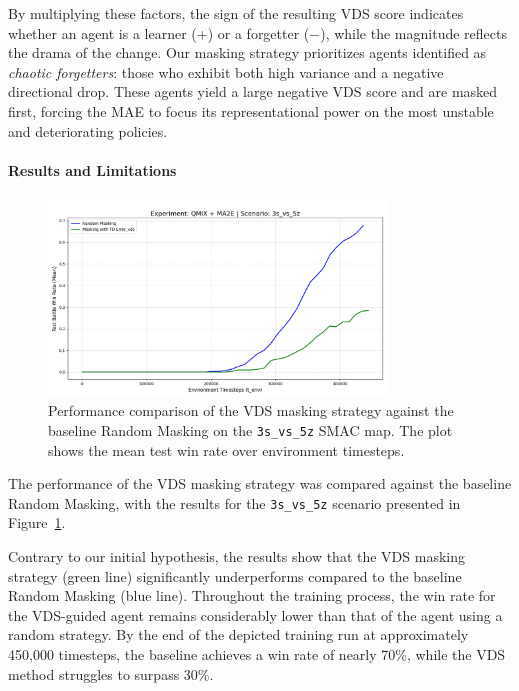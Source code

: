 By multiplying these factors, the sign of the resulting VDS score indicates whether an agent is a learner (+) or a forgetter (−), while the magnitude reflects the drama of the change. Our masking strategy prioritizes agents identified as \textit{chaotic forgetters}: those who exhibit both high variance and a negative directional drop. These agents yield a large negative VDS score and are masked first, forcing the MAE to focus its representational power on the most unstable and deteriorating policies.

\paragraph{Results and Limitations}

\begin{figure}[h]
    \centering
    \includegraphics[width=0.8\textwidth]{images_pfe/results_li-ma2e/test_battle_won_mean_3s_vs_5z_vds_smoothed.png}
    \caption{Performance comparison of the VDS masking strategy against the baseline Random Masking on the \texttt{3s\_vs\_5z} SMAC map. The plot shows the mean test win rate over environment timesteps.}
    \label{fig:vds_vs_random}
\end{figure}

The performance of the VDS masking strategy was compared against the baseline Random Masking, with the results for the \texttt{3s\_vs\_5z} scenario presented in Figure~\ref{fig:vds_vs_random}.

Contrary to our initial hypothesis, the results show that the VDS masking strategy (green line) significantly underperforms compared to the baseline Random Masking (blue line). Throughout the training process, the win rate for the VDS-guided agent remains considerably lower than that of the agent using a random strategy. By the end of the depicted training run at approximately 450,000 timesteps, the baseline achieves a win rate of nearly 70\%, while the VDS method struggles to surpass 30\%.

